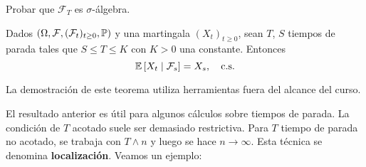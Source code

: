 \begin{ejer}
        Probar que $\mathcal{F}_T$ es $\sigma$-álgebra. 
\end{ejer}

\begin{theorem}
        Dados $(\Omega, \mathcal{F}, (\mathcal{F}_t)_{t \geq 0}, \P)$ y una martingala $(X_t)_{t \geq 0}$, 
        sean $T$, $S$ tiempos de parada tales que $S \leq T \le K$ con $K>0$ una constante. Entonces 
        \begin{equation*}
                \E \left[ X_t \mid  \mathcal{F}_s \right]  = X_s,  ~ ~ ~ \text{c.s.}
        \end{equation*}
\end{theorem}

La demostración de este teorema utiliza herramientas fuera del alcance del curso. 

\newp El resultado anterior es útil para algunos cálculos sobre tiempos de parada. La condición de $T$ acotado 
suele ser demasiado restrictiva. Para $T$ tiempo de parada no acotado, se trabaja con $T \wedge n$ y 
luego se hace $n \to \infty$. Esta técnica se denomina \textbf{localización}. Veamos un ejemplo:

